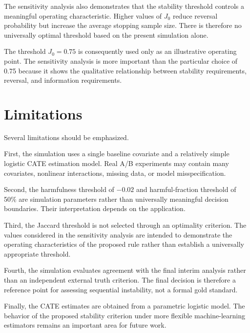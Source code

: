 \documentclass[11pt,a4paper]{article}
\begin{document}
The sensitivity analysis also demonstrates that the stability threshold
controls a meaningful operating characteristic. Higher values of $J_0$
reduce reversal probability but increase the average stopping sample size.
There is therefore no universally optimal threshold based on the present
simulation alone.

The threshold $J_0=0.75$ is consequently used only as an illustrative
operating point. The sensitivity analysis is more important than the
particular choice of 0.75 because it shows the qualitative relationship
between stability requirements, reversal, and information requirements.


\section{Limitations}

Several limitations should be emphasized.

First, the simulation uses a single baseline covariate and a relatively
simple logistic CATE estimation model. Real A/B experiments may contain many
covariates, nonlinear interactions, missing data, or model misspecification.

Second, the harmfulness threshold of $-0.02$ and harmful-fraction threshold
of 50\% are simulation parameters rather than universally meaningful
decision boundaries. Their interpretation depends on the application.

Third, the Jaccard threshold is not selected through an optimality criterion.
The values considered in the sensitivity analysis are intended to demonstrate
the operating characteristics of the proposed rule rather than establish a
universally appropriate threshold.

Fourth, the simulation evaluates agreement with the final interim analysis
rather than an independent external truth criterion. The final decision is
therefore a reference point for assessing sequential instability, not a
formal gold standard.

Finally, the CATE estimates are obtained from a parametric logistic model.
The behavior of the proposed stability criterion under more flexible
machine-learning estimators remains an important area for future work.

\end{document}

